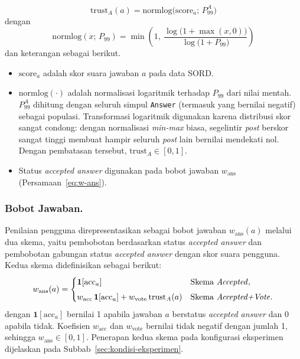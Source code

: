 \begin{equation}
\mathrm{trust}_A(a) = \mathrm{normlog}\big(\mathrm{score}_a;\,P_{99}^{A}\big)
\label{eq:trust-answer}
\end{equation}
dengan
\begin{equation}
\mathrm{normlog}(x;\,P_{99}) = \min\left(1,\ \frac{\log\big(1 + \max(x, 0)\big)}{\log\big(1 + P_{99}\big)}\right)
\label{eq:normlog}
\end{equation}
dan keterangan sebagai berikut.
\begin{itemize}
    \item $\mathrm{score}_a$ adalah skor suara jawaban $a$ pada data SORD.
    \item $\mathrm{normlog}(\cdot)$ adalah normalisasi logaritmik terhadap $P_{99}$ dari nilai mentah. $P_{99}^{A}$ dihitung dengan seluruh simpul \texttt{Answer} (termasuk yang bernilai negatif) sebagai populasi. Transformasi logaritmik digunakan karena distribusi skor sangat condong: dengan normalisasi \emph{min-max} biasa, segelintir \emph{post} berskor sangat tinggi membuat hampir seluruh \emph{post} lain bernilai mendekati nol. Dengan pembatasan tersebut, $\mathrm{trust}_A\in[0,1]$.
    \item Status \emph{accepted answer} digunakan pada bobot jawaban $w_{\mathrm{ans}}$ (Persamaan~\eqref{eq:w-ans}).
\end{itemize}

\subsubsection{Bobot Jawaban.}
Penilaian pengguna direpresentasikan sebagai bobot jawaban $w_{\mathrm{ans}}(a)$ melalui dua skema, yaitu pembobotan berdasarkan status \emph{accepted answer} dan pembobotan gabungan status \emph{accepted answer} dengan skor suara pengguna. Kedua skema didefinisikan sebagai berikut:
\begin{equation}
w_{\mathrm{ans}}(a) =
\begin{cases}
\mathbf{1}[\mathrm{acc}_a] & \text{Skema \emph{Accepted}},\\[4pt]
w_{\mathrm{acc}}\,\mathbf{1}[\mathrm{acc}_a]
+ w_{\mathrm{vote}}\,\mathrm{trust}_A(a)
& \text{Skema \emph{Accepted+Vote}}.
\end{cases}
\label{eq:w-ans}
\end{equation}
dengan $\mathbf{1}[\mathrm{acc}_a]$ bernilai 1 apabila jawaban $a$ berstatus \emph{accepted answer} dan 0 apabila tidak. Koefisien $w_{\mathrm{acc}}$ dan $w_{\mathrm{vote}}$ bernilai tidak negatif dengan jumlah 1, sehingga $w_{\mathrm{ans}}\in[0,1]$. Penerapan kedua skema pada konfigurasi eksperimen dijelaskan pada Subbab~\ref{sec:kondisi-eksperimen}.

